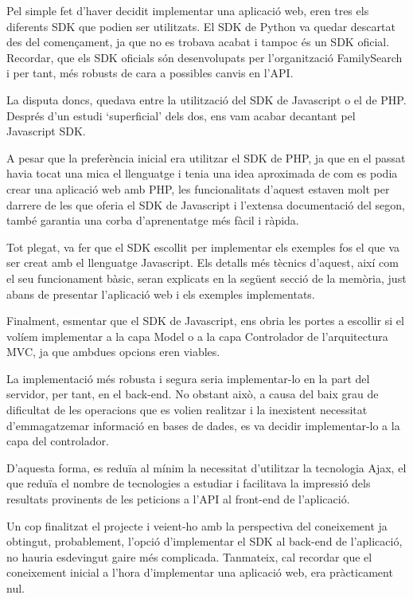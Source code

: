     Pel simple fet d'haver decidit implementar una aplicació web, eren tres els di\-fe\-rents SDK que podien ser utilitzats. El SDK de Python va quedar descartat des del començament, ja que no es trobava acabat i tampoc és un SDK oficial. Recordar, que els SDK oficials són desenvolupats per l'organització FamilySearch i per tant, més robusts de cara a possibles canvis en l’API.

    La disputa doncs, quedava entre la utilització del SDK de Javascript o el de PHP. Després d’un estudi `superficial’ dels dos, ens vam acabar decantant pel Javascript SDK.

    A pesar que la preferència inicial era utilitzar el SDK de PHP, ja que en el passat havia tocat una mica el llenguatge i tenia una idea aproximada de com es podia crear una aplicació web amb PHP, les funcionalitats d'aquest estaven molt per darrere de les que oferia el SDK de Javascript i l'extensa documentació del segon, també garantia una corba d'aprenentatge més fàcil i ràpida.

    Tot plegat, va fer que el SDK escollit per implementar els exemples fos el que va ser creat amb el llenguatge Javascript. Els detalls més tècnics d'aquest, així com el seu funcionament bàsic, seran explicats en la següent secció de la memòria, just abans de presentar l’aplicació web i els exemples implementats.

    Finalment, esmentar que el SDK de Javascript, ens obria les portes a escollir si el volíem implementar a la capa Model o a la capa Controlador de l'arquitectura MVC, ja que ambdues opcions eren viables.

    La implementació més robusta i segura seria implementar-lo en la part del servidor, per tant, en el back-end. No obstant això, a causa del baix grau de dificultat de les operacions que es volien realitzar i la inexistent necessitat d’emmagatzemar informació en bases de dades, es va decidir implementar-lo a la capa del controlador.

    D'aquesta forma, es reduïa al mínim la necessitat d’utilitzar la tecnologia Ajax, el que reduïa el nombre de tecnologies a estudiar i facilitava la impressió dels resultats provinents de les peticions a l’API al front-end de l'aplicació.

    Un cop finalitzat el projecte i veient-ho amb la perspectiva del coneixement ja obtingut, probablement, l’opció d’implementar el SDK al back-end  de l’aplicació, no hauria esdevingut gaire més complicada. Tanmateix, cal recordar que el coneixement inicial a l’hora d’implementar una aplicació web, era pràcticament nul.
